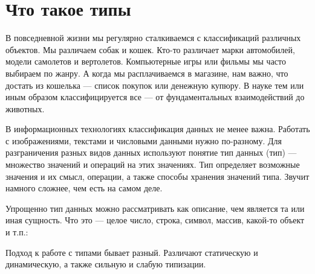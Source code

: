 \documentclass[book.tex]{subfiles}
\begin{document}
%


\maketitle 

\section*{Что такое типы}

В повседневной жизни мы регулярно сталкиваемся с классификаций различных объектов. Мы различаем собак и кошек. Кто-то различает марки автомобилей, модели самолетов и вертолетов. Компьютерные игры или фильмы мы часто выбираем по жанру. А когда мы расплачиваемся в магазине, нам важно, что достать из кошелька --- список покупок или денежную купюру. В науке тем или иным образом классифицируется все --- от фундаментальных взаимодействий до животных.

В информационных технологиях классификация данных не менее важна. Работать с изображениями, текстами и числовыми данными нужно по-разному. Для разграничения разных видов данных используют понятие тип данных (тип) --- множество значений и операций на этих значениях. Тип определяет возможные значения и их смысл, операции, а также способы хранения значений типа. Звучит намного сложнее, чем есть на самом деле.

Упрощенно тип данных можно рассматривать как описание, чем является та или иная сущность. Что это --- целое число, строка, символ, массив, какой-то объект и т.п.:


Подход к работе с типами бывает разный. Различают статическую и динамическую, а также сильную и слабую типизации.

\end{document}
